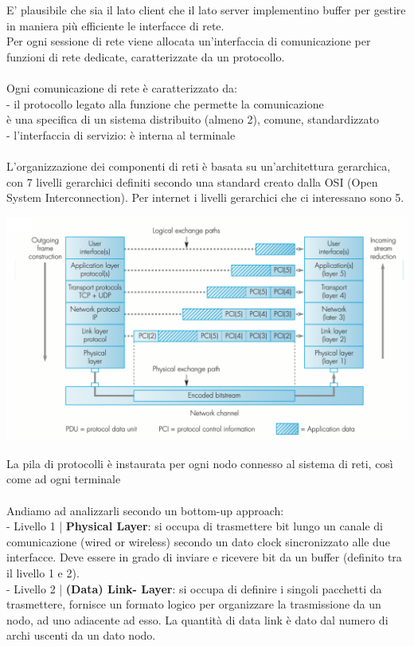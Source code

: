 \documentclass[11pt, oneside]{article}   	%
\begin{document}
E' plausibile che sia il lato client che il lato server implementino buffer per gestire in maniera più efficiente le interfacce di rete.\\
Per ogni sessione di rete viene allocata un'interfaccia di comunicazione per funzioni di rete dedicate, caratterizzate da un protocollo. \\\\
Ogni comunicazione di rete è caratterizzato da:\\
- il protocollo legato alla funzione che permette la comunicazione\\
è una specifica di un sistema distribuito (almeno 2), comune, standardizzato\\
- l'interfaccia di servizio: è interna al terminale\\\\
L'organizzazione dei componenti di reti è basata su un'architettura gerarchica, con 7 livelli gerarchici definiti secondo una standard creato dalla OSI (Open System Interconnection). Per internet i livelli gerarchici che ci interessano sono 5.
\begin{center}
\includegraphics[scale=0.6]{osi}
\end{center}
La pila di protocolli è instaurata per ogni nodo connesso al sistema di reti, così come ad ogni terminale\\\\
Andiamo ad analizzarli secondo un bottom-up approach:\\
- Livello 1 | \textbf{Physical Layer}: si occupa di trasmettere bit lungo un canale di comunicazione (wired or wireless) secondo un dato clock sincronizzato alle due interfacce. Deve essere in grado di inviare e ricevere bit da un buffer (definito tra il livello 1 e 2).\\
- Livello 2 | \textbf{(Data) Link- Layer}: si occupa di definire i singoli pacchetti da trasmettere, fornisce un formato logico per organizzare la trasmissione da un nodo, ad uno adiacente ad esso. La quantità di data link è dato dal numero di archi uscenti da un dato nodo.\\
\end{document}
